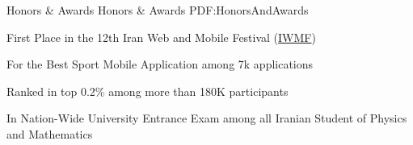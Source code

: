 \documentclass[letterpaper,MMMyyyy,nonstopmode]{simpleresumecv}
\begin{document}
\begin{Body}










\Section
{Honors \&\newline
Awards}
{Honors \& Awards}
{PDF:HonorsAndAwards}

\BulletItem
First Place in the 12th Iran Web and Mobile Festival
(\href{https://iwmf.ir}
{\small{IWMF}}) 
\hfill
\textsl{\small{}}
\begin{Detail}
\Item
For the Best Sport Mobile Application among 7k applications
\end{Detail}

\Gap
\BulletItem
Ranked in top 0.2\% among more than 180K participants
\hfill
\textsl{\small{}}
\begin{Detail}
\Item
In Nation-Wide University Entrance Exam among
all Iranian Student of Physics and Mathematics
\end{Detail}


\end{Body}
\end{document}

